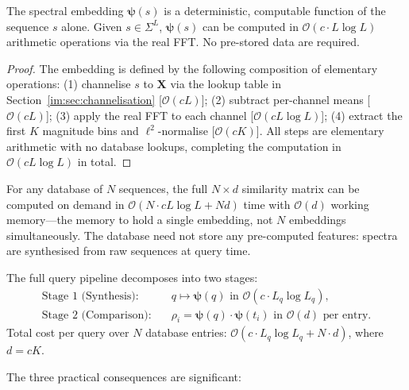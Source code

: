 \begin{proposition}
\label{im:prop:determinism}
The spectral embedding $\bm{\psi}(s)$ is a deterministic, computable function
of the sequence $s$ alone. Given $s \in \Sigma^L$, $\bm{\psi}(s)$ can be
computed in $\mathcal{O}(c \cdot L\log L)$ arithmetic operations via the real
FFT. No pre-stored data are required.
\end{proposition}

\begin{proof}
The embedding is defined by the following composition of elementary operations:
(1) channelise $s$ to $\mathbf{X}$ via the lookup table in
Section~\ref{im:sec:channelisation} [$\mathcal{O}(cL)$];
(2) subtract per-channel means [$\mathcal{O}(cL)$];
(3) apply the real FFT to each channel [$\mathcal{O}(cL\log L)$];
(4) extract the first $K$ magnitude bins and $\ell^2$-normalise [$\mathcal{O}(cK)$].
All steps are elementary arithmetic with no database lookups, completing
the computation in $\mathcal{O}(cL\log L)$ in total.
\end{proof}

\begin{corollary}
\label{im:cor:empty_db}
For any database of $N$ sequences, the full $N \times d$ similarity matrix
can be computed on demand in $\mathcal{O}(N\cdot cL\log L + Nd)$ time with
$\mathcal{O}(d)$ working memory---the memory to hold a single embedding, not
$N$ embeddings simultaneously. The database need not store any pre-computed
features: spectra are synthesised from raw sequences at query time.
\end{corollary}

\begin{proposition}
\label{im:prop:decomp}
The full query pipeline decomposes into two stages:
\begin{align}
  \text{Stage 1 (Synthesis):}  & \quad q \mapsto \bm{\psi}(q)
    \text{ in } \mathcal{O}(c\cdot L_q\log L_q),
    \label{im:eq:stage1}\\
  \text{Stage 2 (Comparison):} & \quad \rho_i = \bm{\psi}(q)\cdot\bm{\psi}(t_i)
    \text{ in } \mathcal{O}(d) \text{ per entry.}
    \label{im:eq:stage2}
\end{align}
Total cost per query over $N$ database entries:
$\mathcal{O}(c\cdot L_q\log L_q + N\cdot d)$, where $d = cK$.
\end{proposition}

The three practical consequences are significant:

